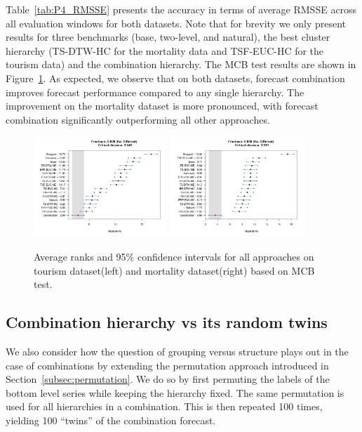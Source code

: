\documentclass[a4paper,review,12pt,authoryear]{elsarticle}
\begin{document}
Table~\ref{tab:P4_RMSSE} presents the accuracy in terms of average RMSSE across all evaluation windows for both datasets. Note that for brevity we only present results for three benchmarks (base, two-level, and natural), the best cluster hierarchy (TS-DTW-HC for the mortality data and TSF-EUC-HC for the tourism data) and the combination hierarchy. The MCB test results are shown in Figure~\ref{fig:P4_bench_mcb}. 
As expected, we observe that on both datasets, forecast combination improves forecast performance compared to any single hierarchy. 
The improvement on the mortality dataset is more pronounced, with forecast combination significantly outperforming all other approaches.

\begin{figure}[h!]
    \centering
    \includegraphics[width=0.45\textwidth]{../figures/Figure12_tourism_mcb_combination.jpg}
    \includegraphics[width=0.45\textwidth]{../figures/Figure12_mortality_mcb_combination.jpg}
    \caption{\label{fig:P4_bench_mcb}Average ranks and 95\% confidence intervals for all approaches on tourism dataset(left) and mortality dataset(right) based on MCB test.}
\end{figure}



\subsection{Combination hierarchy vs its random twins}

We also consider how the question of grouping versus structure plays out in the case of combinations by extending the permutation approach introduced in Section~\ref{subsec:permutation}. We do so by first permuting the labels of the bottom level series while keeping the hierarchy fixed. The same permutation is used for all hierarchies in a combination. This is then repeated 100 times, yielding 100 ``twins'' of the combination forecast.
\end{document}
